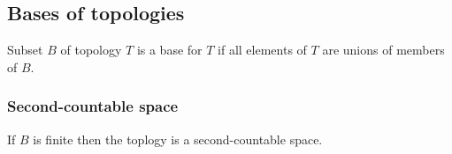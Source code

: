 
\subsection{Bases of topologies}

Subset \(B\) of topology \(T\) is a base for \(T\) if all elements of \(T\) are unions of members of \(B\).

\subsubsection{Second-countable space}

If \(B\) is finite then the toplogy is a second-countable space.

